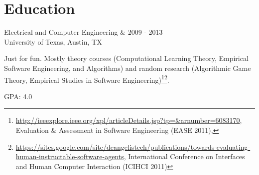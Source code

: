 \documentclass[letterpaper]{scrartcl}
\begin{document}
\section*{Education}
\begin{list1}
\item
  \begin{tabular1bold}Electrical and Computer Engineering & 2009 - 2013 \\
    University of Texas, Austin, TX
  \end{tabular1bold}

  \begin{adjustwidth}{1.5em}{1.5em}
    Just for fun. Mostly theory courses (Computational Learning Theory, Empirical Software Engineering, and Algorithms) and random research (Algorithmic Game Theory, Empirical Studies in Software Engineering)\footnote{\href{Designing human benchmark experiments for testing software agents}{http://ieeexplore.ieee.org/xpl/articleDetails.jsp?tp=\&arnumber=6083170}, Evaluation \& Assessment in Software Engineering (EASE 2011), }\footnote{\href{Towards Evaluating Human-Instructable Software Agents}{https://sites.google.com/site/deangelistech/publications/towards-evaluating-human-instructable-software-agents}, International Conference on Interfaces and Human Computer Interaction (ICIHCI 2011)}.
  \end{adjustwidth}
  \begin{list2}
  \item GPA: 4.0
  \end{list2}


\end{list1}
\end{document}
